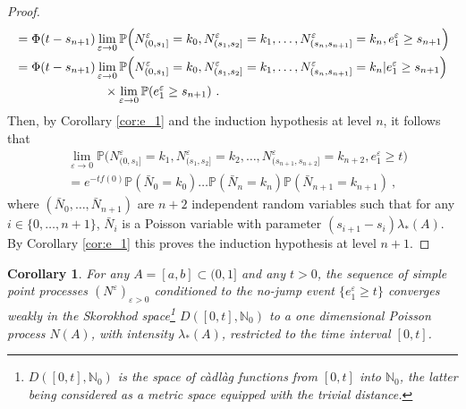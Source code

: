 \documentclass[reqno, 12pt, a4paper]{amsart}
\theoremstyle{plain}
\newtheorem{corollary}[theorem]{Corollary}
\theoremstyle{definition}
\begin{document}
\begin{proof}
\begin{equation}
\begin{split}
&= \Phi (t -s_{n+1})  \lim_{\varepsilon \to 0} \mathbb P \Big (N_{(0,s_1]}^\varepsilon =k_0, N^\varepsilon_{(s_1,s_2]} = k_1, \ldots,  N^\varepsilon_{(s_{n},s_{n+1}]} = k_{n}, e_1^{\varepsilon} \ge s_{n+1} \Big) \\
&=\Phi (t -s_{n+1})  \lim_{\varepsilon \to 0} \mathbb P \Big (N_{(0,s_1]}^\varepsilon =k_0, N^\varepsilon_{(s_1,s_2]} = k_1, \ldots,  N^\varepsilon_{(s_{n},s_{n+1}]} = k_{n} \vert e_1^{\varepsilon} \ge s_{n+1} \Big)\\
& \hspace{2,5cm}   \times \lim_{\varepsilon \to 0} \mathbb P (e_1^\varepsilon \ge s_{n+1}) \ .
\end{split}
\end{equation}
Then, by Corollary \ref{cor:e_1} and the induction hypothesis at level $n$, it follows that
\begin{equation}
\begin{split}
&\lim_{\varepsilon \to 0} \mathbb P \Big (N_{(0,s_1]}^\varepsilon =k_1, N^\varepsilon_{(s_1,s_2]} = k_2, \ldots,  N^\varepsilon_{(s_{n+1},s_{n+2}]} = k_{n+2}, e_1^{\varepsilon} \ge t \Big) \\ 
&= e^{-t f(0)} \mathbb P ({\bar N}_0 = k_0) \ldots \mathbb P({\bar N}_{n}=k_{n}) \mathbb P ({\bar N}_{n+1} = k_{n+1}) \ ,
\end{split}
\end{equation}
where $(\bar N_0, \ldots, \bar N_{n+1})$ are $n+2$ independent random variables such that for any $i\in \{0,\ldots, n+1\}$, $\bar N_i$ is a Poisson variable with parameter $(s_{i+1} -s_i) \lambda_{*} (A)$. By Corollary \ref{cor:e_1} this proves the induction hypothesis at level $n+1$. 
\end{proof}


\begin{corollary}
\label{cor:indPoisson}
For any $A=[a,b] \subset (0,1]$ and any $t>0$, the sequence of simple point processes $(N^\varepsilon)_{\varepsilon>0}$ conditioned to the no-jump event $\{e_1^\varepsilon \ge t\}$ converges weakly in the Skorokhod space{\footnote{$D([0,t], \mathbb N_0)$ is the space of c\`adl\`ag functions from $[0,t]$ into $\mathbb N_0$, the latter being considered as a metric space equipped with the trivial distance.}} $D([0,t], \mathbb N_0)$ to a one dimensional Poisson process ${N} (A)$, with intensity $\lambda_* (A)$, restricted to the time interval $[0,t]$. 
\end{corollary}
\end{document}

